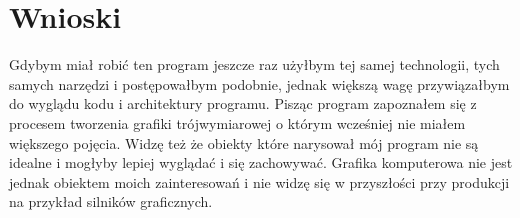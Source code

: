 \documentclass[a4paper,11pt,notitlepage]{article}
\begin{document}
\section{Wnioski}

Gdybym miał robić ten program jeszcze raz użyłbym tej samej technologii, tych samych narzędzi i postępowałbym podobnie, jednak większą wagę przywiązałbym do wyglądu kodu i architektury programu. Pisząc program zapoznałem się z procesem tworzenia grafiki trójwymiarowej o którym wcześniej nie miałem większego pojęcia. Widzę też że obiekty które narysował mój program nie są idealne i mogłyby lepiej wyglądać i się zachowywać. Grafika komputerowa nie jest jednak obiektem moich zainteresowań i nie widzę się w przyszłości przy produkcji na przykład silników graficznych.
\end{document}
